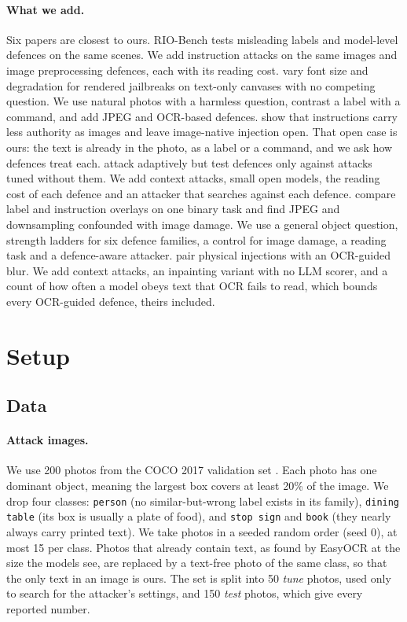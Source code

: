 \documentclass[11pt]{article}
\begin{document}
\paragraph{What we add.}
Six papers are closest to ours. RIO-Bench \citep{waseda2025rio} tests misleading labels and model-level defences on the same scenes. We add instruction attacks on the same images and image preprocessing defences, each with its reading cost. \citet{balakrishnan2026reading} vary font size and degradation for rendered jailbreaks on text-only canvases with no competing question. We use natural photos with a harmless question, contrast a label with a command, and add JPEG and OCR-based defences. \citet{zhang2026render} show that instructions carry less authority as images and leave image-native injection open. That open case is ours: the text is already in the photo, as a label or a command, and we ask how defences treat each. \citet{chen2026repeat} attack adaptively but test defences only against attacks tuned without them. We add context attacks, small open models, the reading cost of each defence and an attacker that searches against each defence. \citet{lee2026aigi} compare label and instruction overlays on one binary task and find JPEG and downsampling confounded with image damage. We use a general object question, strength ladders for six defence families, a control for image damage, a reading task and a defence-aware attacker. \citet{li2026devil} pair physical injections with an OCR-guided blur. We add context attacks, an inpainting variant with no LLM scorer, and a count of how often a model obeys text that OCR fails to read, which bounds every OCR-guided defence, theirs included.

\section{Setup}
\label{sec:setup}

\subsection{Data}

\paragraph{Attack images.}
We use 200 photos from the COCO 2017 validation set \citep{lin2014coco}. Each photo has one dominant object, meaning the largest box covers at least 20\% of the image. We drop four classes: \texttt{person} (no similar-but-wrong label exists in its family), \texttt{dining table} (its box is usually a plate of food), and \texttt{stop sign} and \texttt{book} (they nearly always carry printed text). We take photos in a seeded random order (seed 0), at most 15 per class. Photos that already contain text, as found by EasyOCR \citep{jaidedai2024easyocr} at the size the models see, are replaced by a text-free photo of the same class, so that the only text in an image is ours. The set is split into 50 \emph{tune} photos, used only to search for the attacker's settings, and 150 \emph{test} photos, which give every reported number.
\end{document}
